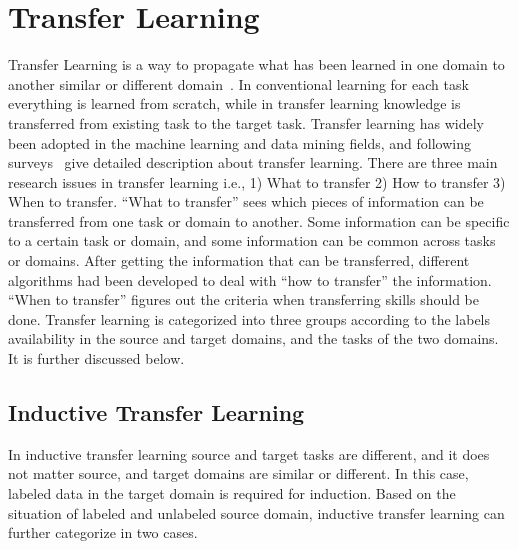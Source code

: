 \section{Transfer Learning}
Transfer Learning is a way to propagate what has been learned in one domain to another similar or different domain~\cite{cook2013transfer}. %
In conventional learning for each task everything is learned from scratch, while in transfer learning knowledge is transferred from existing task to the target task. Transfer learning has widely been adopted in the machine learning and data mining fields, and following surveys~\cite{5288526, Weiss2016} give detailed description about transfer learning.
There are three main research issues in transfer learning i.e., 1) What to transfer 2) How to transfer 3) When to transfer.
\noindent
\enquote{What to transfer} sees which pieces of information can be transferred from one task or domain to another. Some information can be specific to a certain task or domain, and some information can be common across tasks or domains. After getting the information that can be transferred, different algorithms had been developed to deal with \enquote{how to transfer} the information. \enquote{When to transfer} figures out the criteria when transferring skills should be done. 
Transfer learning is categorized into three groups according to the labels availability in the source and target domains, and the tasks of the two domains. It is further discussed below.
\subsection{Inductive Transfer Learning}
In inductive transfer learning source and target tasks are different, and it does not matter source, and target domains are similar or different. In this case, labeled data in the target domain is required for induction. Based on the situation of labeled and unlabeled source domain, inductive transfer learning can further categorize in two cases.%

